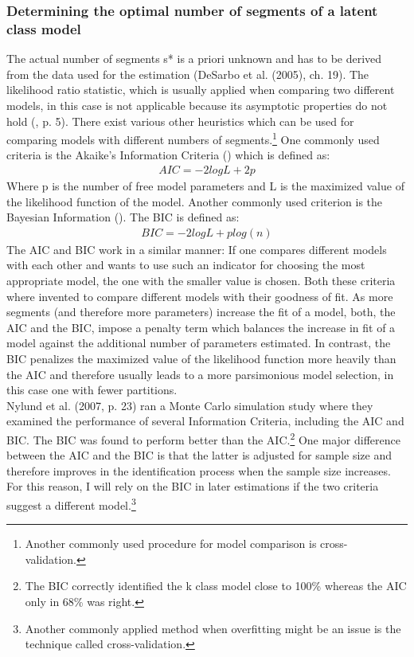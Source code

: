\documentclass[12pt, abstracton]{article}
\begin{document}
\subsubsection{Determining the optimal number of segments of a latent class model}
\label{opt_number_lc}
The actual number of segments s* is a priori unknown and has to be derived from the data used for the estimation (DeSarbo et al. (2005), ch. 19). The likelihood ratio statistic, which is usually applied when comparing two different models, in this case is not applicable because its asymptotic properties do not hold (\cite{Aitkin1985}, p. 5). There exist various other heuristics which can be used for comparing models with different numbers of segments.\footnote{Another commonly used procedure for model comparison is cross-validation.} One commonly used criteria is the Akaike’s Information Criteria (\cite{Akaike1974}) which is defined as:
\begin{align}
AIC = -2log L + 2p 
\end{align}
Where p is the number of free model parameters and L is the maximized value of the likelihood function of the model. Another commonly used criterion is the Bayesian Information (\cite{Schwarz1978}). The BIC is defined as:
\begin{align}
BIC = -2log L + p log(n)
\end{align}
The AIC and BIC work in a similar manner: If one compares different models with each other and wants to use such an indicator for choosing the most appropriate model, the one with the smaller value is chosen.
Both these criteria where invented to compare different models with their goodness of fit. As more segments (and therefore more parameters) increase the fit of a model, both, the AIC and the BIC, impose a penalty term which balances the increase in fit of a model against the additional number of parameters estimated. In contrast, the BIC penalizes the maximized value of the likelihood function more heavily than the AIC and therefore usually leads to a more parsimonious model selection, in this case one with fewer partitions.\\
Nylund et al. (2007, p. 23) ran a Monte Carlo simulation study where they examined the performance of several Information Criteria, including the AIC and BIC. The BIC was found to perform better than the AIC.\footnote{The BIC correctly identified the k class model close to 100\% whereas the AIC only in 68\% was right.} One major difference between the AIC and the BIC is that the latter is adjusted for sample size and therefore improves in the identification process when the sample size increases. For this reason, I will rely on the BIC in later estimations if the two criteria suggest a different model.\footnote{Another commonly applied method when overfitting might be an issue is the technique called cross-validation.}
\end{document}
